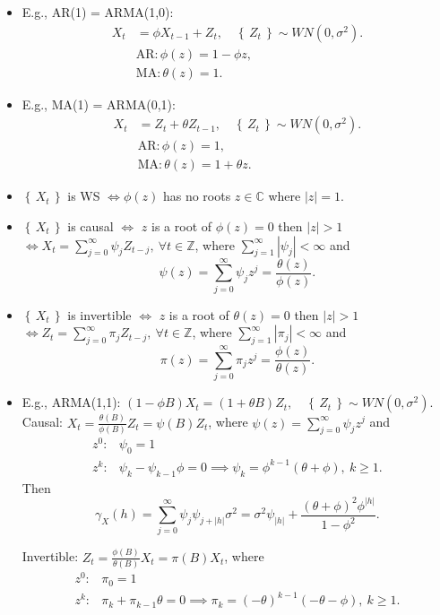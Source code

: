 \documentclass[paper=a4,fontsize=2.89mm]{scrartcl}
\newcommand{\Z}{\mathbb{Z}}
\newcommand{\C}{\mathbb{C}}
\newcommand\abs[1]{\left| #1 \right|}
\newcommand\set[1]{\left\{\, #1 \,\right\}}
\begin{document}
\begin{multicols}{3}
\begin{itemize}
\item E.g., AR(1) = ARMA(1,0): 
\begin{align*}
X_t& = \phi X_{t-1} + Z_t, \quad \set{Z_t} \sim WN(0,\sigma^2). \\
&\text{AR}:  \phi(z) = 1 - \phi z, \\
&\text{MA}:  \theta(z) = 1.
\end{align*}
\item E.g., MA(1) = ARMA(0,1): 
\begin{align*}
X_t& = Z_t + \theta Z_{t-1}, \quad \set{Z_t} \sim WN(0,\sigma^2). \\
&\text{AR}:  \phi(z) = 1, \\
&\text{MA}:  \theta(z) = 1 + \theta z.
\end{align*}

\item $\set{X_t}$ is WS  $\iff \phi(z)$ has no roots $z \in \C$ where $\abs{z} = 1$. \\

\item $\set{X_t}$ is causal $\iff$ $z$ is a root of $\phi(z) = 0$ then $\abs{z} > 1$
$\iff X_t = \sum_{j=0}^\infty \psi_j Z_{t-j}, ~ \forall t \in \Z$, where $\sum_{j=1}^\infty \abs{\psi_j} < \infty$ and
$$\psi(z) = \sum_{j=0}^\infty \psi_jz^j = \frac{\theta(z)}{\phi(z)}.$$

\item $\set{X_t}$ is invertible $\iff$ $z$ is a root of $\theta(z) = 0$ then $\abs{z} > 1$
$\iff Z_t = \sum_{j=0}^\infty \pi_j Z_{t-j}, ~ \forall t \in \Z$, where $\sum_{j=1}^\infty \abs{\pi_j} < \infty$ and
$$\pi(z) = \sum_{j=0}^\infty \pi_jz^j = \frac{\phi(z)}{\theta(z)}.$$

\item E.g., ARMA(1,1): $(1-\phi B) X_t = (1 + \theta B) Z_t, \quad \set{Z_t} \sim WN(0,\sigma^2)$. \\
Causal: $X_t = \frac{\theta(B)}{\phi(B)}Z_t = \psi(B)Z_t$, where $\psi(z) = \sum_{j=0}^\infty \psi_j z^j$ and
\begin{align*}
z^0: & \psi_0 = 1 \\
z^k: & \psi_k - \psi_{k-1}\phi = 0 \implies \psi_k = \phi^{k-1}(\theta + \phi), ~k\ge1.
\end{align*}
Then $$\gamma_X(h) = \sum_{j=0}^\infty\psi_j\psi_{j+\abs{h}}\sigma^2 = \sigma^2\psi_{\abs{h}} + \frac{(\theta + \phi)^2\phi^{\abs{h}}}{1-\phi^2}.$$

Invertible: $Z_t = \frac{\phi(B)}{\theta(B)}X_t = \pi(B)X_t$, where
\begin{align*}
z^0: & \pi_0 = 1 \\
z^k: & \pi_k + \pi_{k-1}\theta = 0 \implies \pi_k = (-\theta)^{k-1}(-\theta - \phi), ~k\ge1.
\end{align*}


\end{itemize}
\end{multicols}
\end{document}
